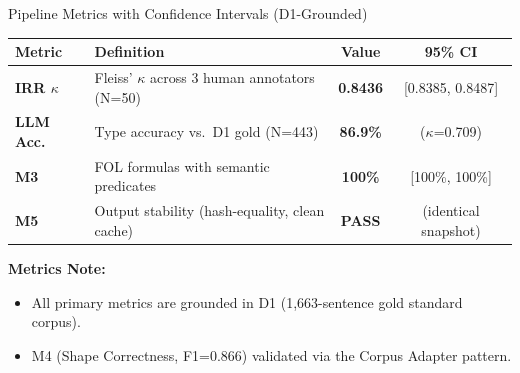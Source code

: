 \documentclass[aspectratio=169, 10pt]{beamer}
\begin{document}
\begin{frame}{Pipeline Metrics with Confidence Intervals (D1-Grounded)}
    \begin{table}[]
        \centering
        \begin{tabular}{llcc}
            \toprule
            \textbf{Metric} & \textbf{Definition} & \textbf{Value} & \textbf{95\% CI} \\
            \midrule
            \textbf{IRR $\kappa$} & Fleiss' $\kappa$ across 3 human annotators (N=50) & \textbf{0.8436} & [0.8385, 0.8487] \\
            \textbf{LLM Acc.} & Type accuracy vs.\ D1 gold (N=443) & \textbf{86.9\%} & ($\kappa$=0.709) \\
            \textbf{M3} & FOL formulas with semantic predicates & \textbf{100\%} & [100\%, 100\%] \\
            \textbf{M5} & Output stability (hash-equality, clean cache) & \textbf{PASS} & (identical snapshot) \\
            \bottomrule
        \end{tabular}
    \end{table}
    
    \vspace{0.3cm}
    \textbf{Metrics Note:}
    \begin{itemize}
        \item All primary metrics are grounded in D1 (1,663-sentence gold standard corpus).
        \item M4 (Shape Correctness, F1=0.866) validated via the Corpus Adapter pattern.
    \end{itemize}
\end{frame}
\end{document}
